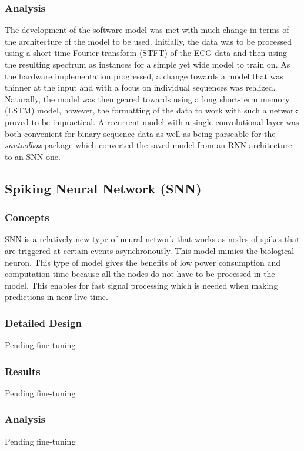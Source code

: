 \documentclass[12pt,titlepage]{article}
\begin{document}
\subsubsection{Analysis}
The development of the software model was met with much change in terms of the architecture of the model to be used. Initially, the data was to be processed using
a short-time Fourier transform (STFT) of the ECG data and then using the resulting spectrum as instances for a simple yet wide model to train on. As the hardware 
implementation progressed, a change towards a model that was thinner at the input and with a focus on individual sequences was realized. Naturally, the model was 
then geared towards using a long short-term memory (LSTM) model, however, the formatting of the data to work with such a network proved to be impractical. A 
recurrent model with a single convolutional layer was both convenient for binary sequence data as well as being parseable for the \emph{snntoolbox} package which
converted the saved model from an RNN architecture to an SNN one. 

\subsection{Spiking Neural Network (SNN)}
\subsubsection{Concepts}
SNN is a relatively new type of neural network that works as nodes of spikes that are triggered at certain events asynchronously. This model
mimics the biological neuron. This type of model gives the benefits of low power consumption and computation time because all the nodes do
not have to be processed in the model. This enables for fast signal processing which is needed when making predictions in near live time.

\subsubsection{Detailed Design}
Pending fine-tuning

\subsubsection{Results}
Pending fine-tuning

\subsubsection{Analysis}
Pending fine-tuning
\end{document}
